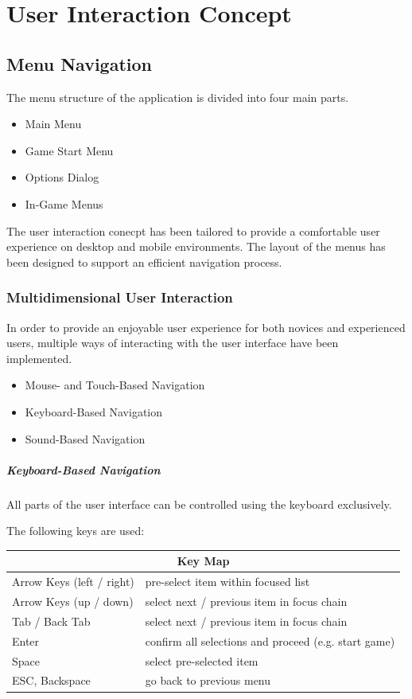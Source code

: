 \chapter[User Interaction Concept \textsuperscript{Novotny}]{User Interaction Concept}
 \label{chap:UserInteractionConcept}
\section{Menu Navigation}
The menu structure of the application is divided into four main parts. \\
\begin {itemize}
	\item {Main Menu}
	\item {Game Start Menu}
	\item {Options Dialog}
	\item {In-Game Menus}
\end {itemize}
The user interaction conecpt has been tailored to provide a comfortable user experience on desktop and mobile environments.
The layout of the menus has been designed to support an efficient navigation process. 

\subsection{Multidimensional User Interaction}
In order to provide an enjoyable user experience for both novices and experienced users, multiple ways of interacting with the user interface have been implemented.
\begin {itemize}
	\item {Mouse- and Touch-Based Navigation}
	\item {Keyboard-Based Navigation}
	\item {Sound-Based Navigation}
\end {itemize}
\paragraph{Keyboard-Based Navigation}
All parts of the user interface can be controlled using the keyboard exclusively. 

The following keys are used:

\begin{tabular}{ |l|l| }
  \hline
  \multicolumn{2}{|c|}{Key Map} \\
  \hline
  Arrow Keys (left / right) & pre-select item within focused list \\
  Arrow Keys (up / down) & select next / previous item in focus chain \\
  Tab / Back Tab & select next / previous item in focus chain \\
  Enter & confirm all selections and proceed (e.g. start game) \\
  Space & select pre-selected item \\
  ESC, Backspace & go back to previous menu \\
  \hline
\end{tabular}

